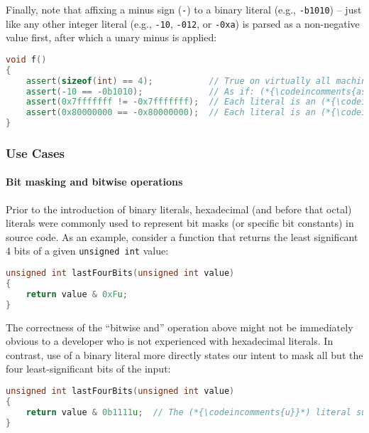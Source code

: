 \documentclass[twoside,10pt,letterpaper,usenames]{newstyle-PearsonGeneric-7-38}
\newcommand{\codeincomments}{\color{skyblue}\ttfamily}
\begin{document}
Finally, note that affixing a minus sign (\texttt{-}) to a binary
literal (e.g., \texttt{-b1010}) -- just like any other integer literal
(e.g., \texttt{-10}, \texttt{-012}, or \texttt{-0xa}) is parsed as a
non-negative value first, after which a unary minus is applied:

\begin{lstlisting}[language=C++]
void f()
{
    assert(sizeof(int) == 4);           // True on virtually all machines today.
    assert(-10 == -0b1010);             // As if: (*{\codeincomments{assert(0 - 10 == 0 - 0b1010);}}*)
    assert(0x7fffffff != -0x7fffffff);  // Each literal is an (*{\codeincomments{signed int}}*).
    assert(0x80000000 == -0x80000000);  // Each literal is an (*{\codeincomments{unsigned int}}*).
}
\end{lstlisting}
    

\subsubsection[Use Cases]{Use Cases}\label{use-cases}

\paragraph[Bit masking and bitwise operations]{Bit masking and bitwise operations}\label{bit-masking-and-bitwise-operations}

Prior to the introduction of binary literals, hexadecimal (and before
that octal) literals were commonly used to represent bit masks (or
specific bit constants) in source code. As an example, consider a
function that returns the least significant 4 bits of a given
\texttt{unsigned int} value:

\begin{lstlisting}[language=C++]
unsigned int lastFourBits(unsigned int value)
{
    return value & 0xFu;
}
\end{lstlisting}
    

The correctness of the ``bitwise and'' operation above might not be
immediately obvious to a developer who is not experienced with
hexadecimal literals. In contrast, use of a binary literal more directly
states our intent to mask all but the four least-significant bits of the
input:

\begin{lstlisting}[language=C++]
unsigned int lastFourBits(unsigned int value)
{
    return value & 0b1111u;  // The (*{\codeincomments{u}}*) literal suffix here is entirely optional.
}
\end{lstlisting}
    
\end{document}
